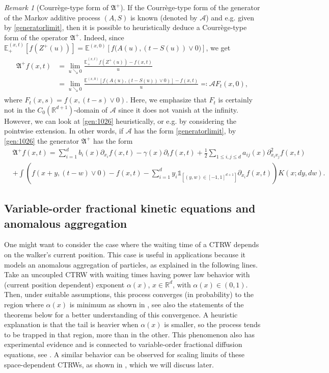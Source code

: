 \documentclass[reqno]{amsart}
\theoremstyle{remark}
\newtheorem{remark}[theorem]{Remark}
\numberwithin{equation}{section} %
\newcommand{\R}{\mathbb{R}}
\newcommand{\ex}{\mathds{E}}
\newcommand{\1}{\mathds{1}}
\begin{document}
	
	\begin{remark}[Courrège-type form of $\mathfrak{A}^+$]
		If the Courrège-type form of the generator of the Markov additive process $(A,S)$ is known (denoted by $\mathcal{A}$) and e.g. given by \eqref{generatorlimit}, then it is possible to heuristically deduce a Courrège-type form of the operator $\mathfrak{A}^+$. Indeed, since $\ex^{(x,t)}_+ [f(Z^+(u))]=\ex^{(x,0)}\left[ f\big(A(u),(t-S(u))\vee 0\big)\right]$, we get
		\begin{align}
			\begin{split}\label{gen:1026}
				\mathfrak{A}^+f(x,t)&=\lim_{u\searrow0}\frac{\ex^{(x,t)}_+f({Z^+(u)})-f(x,t)}{u}\\
				&=\lim_{u\searrow0}\frac{\ex^{(x,0)}[ f(A(u),(t-S(u))\vee 0)]-f(x,t)}{u}\eqqcolon\mathcal{A}F_t(x,0),
			\end{split}
		\end{align}
		where $F_t(x,s)=f(x,(t-s)\vee 0)$. Here, we emphasize that $F_t$ is certainly not in the $C_0(\R^{d+1})$-domain of $\mathcal{A}$ since it does not vanish at the infinity. However, we can look at \eqref{gen:1026} heuristically, or e.g. by considering the pointwise extension. In other words, if $\mathcal{A}$ has the form \eqref{generatorlimit}, by \eqref{gen:1026} the generator $\mathfrak{A}^+$ has the form
		\begin{align*}
			&\mathfrak{A}^+f(x,t)=\sum_{i=1}^d b_i(x) \partial_{x_i} f(x,t) - \gamma(x) \partial_t f(x,t) + \frac{1}{2} \sum_{1 \leq i, j \leq d} a_{ij}(x) \partial_{x_ix_j}^2f(x,t)  \\
			&+ \int \left( f(x+y, (t-w)\vee 0) - f(x,t)-\sum_{i=1}^d y_i \mathds{1}_{[(y,w) \in [-1,1]^{d+1}]} \partial_{x_i} f(x,t)\right) K(x;dy,dw).
		\end{align*}
	\end{remark}
	
	\subsection{Variable-order fractional kinetic equations and anomalous aggregation}
	One might want to consider the case where the waiting time of a CTRW depends on the walker's current position. This case is useful in applications because it models an anomalous aggregation of particles, as explained in the following lines. Take an uncoupled CTRW with waiting times having power law behavior with (current position dependent) exponent $\alpha(x)$, $x \in \mathbb{R}^d$, with $\alpha(x) \in (0,1)$. Then, under suitable assumptions, this process converges (in probability) to the region where $\alpha(x)$ is minimum as shown in \cite{fedotov2012subdiffusive}, see also the statements of the theorems below for a better understanding of this convergence. A heuristic explanation is that the tail is heavier when $\alpha(x)$ is smaller, so the process tends to be trapped in that region, more than in the other. This phenomenon also has experimental evidence and is connected to variable-order fractional diffusion equations, see \cite{fedotov2019asymptotic, fedotov2021variable}. A similar behavior can be observed for scaling limits of these space-dependent CTRWs, as shown in \cite{savtoa}, which we will discuss later.
	
\end{document}
